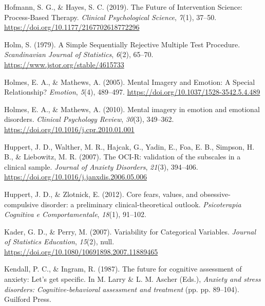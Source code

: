 \documentclass[
  man,floatsintext]{apa7}
\newlength{\cslhangindent}
\newlength{\cslentryspacingunit} %
\newenvironment{CSLReferences}[2] %
 {%
  \setlength{\parindent}{0pt}
  \ifodd #1
  \let\oldpar\par
  \def\par{\hangindent=\cslhangindent\oldpar}
  \fi
  \setlength{\parskip}{#2\cslentryspacingunit}
 }%
 {}
\begin{document}
\begin{CSLReferences}{1}{0}
\leavevmode{}%
Hofmann, S. G., \& Hayes, S. C. (2019). The Future of Intervention Science: Process-Based Therapy. \emph{Clinical Psychological Science}, \emph{7}(1), 37--50. \url{https://doi.org/10.1177/2167702618772296}

\leavevmode{}%
Holm, S. (1979). A Simple Sequentially Rejective Multiple Test Procedure. \emph{Scandinavian Journal of Statistics}, \emph{6}(2), 65--70. \url{https://www.jstor.org/stable/4615733}

\leavevmode{}%
Holmes, E. A., \& Mathews, A. (2005). Mental Imagery and Emotion: A Special Relationship? \emph{Emotion}, \emph{5}(4), 489--497. \url{https://doi.org/10.1037/1528-3542.5.4.489}

\leavevmode{}%
Holmes, E. A., \& Mathews, A. (2010). Mental imagery in emotion and emotional disorders. \emph{Clinical Psychology Review}, \emph{30}(3), 349--362. \url{https://doi.org/10.1016/j.cpr.2010.01.001}

\leavevmode{}%
Huppert, J. D., Walther, M. R., Hajcak, G., Yadin, E., Foa, E. B., Simpson, H. B., \& Liebowitz, M. R. (2007). The OCI-R: validation of the subscales in a clinical sample. \emph{Journal of Anxiety Disorders}, \emph{21}(3), 394--406. \url{https://doi.org/10.1016/j.janxdis.2006.05.006}

\leavevmode{}%
Huppert, J. D., \& Zlotnick, E. (2012). Core fears, values, and obsessive-compulsive disorder: a preliminary clinical-theoretical outlook. \emph{Psicoterapia Cognitiva e Comportamentale}, \emph{18}(1), 91--102.

\leavevmode{}%
Kader, G. D., \& Perry, M. (2007). Variability for Categorical Variables. \emph{Journal of Statistics Education}, \emph{15}(2), null. \url{https://doi.org/10.1080/10691898.2007.11889465}

\leavevmode{}%
Kendall, P. C., \& Ingram, R. (1987). The future for cognitive assessment of anxiety: Let's get specific. In M. Larry \& L. M. Ascher (Eds.), \emph{Anxiety and stress disorders: Cognitive-behavioral assessment and treatment} (pp. pp. 89--104). Guilford Press.


\end{CSLReferences}
\end{document}
